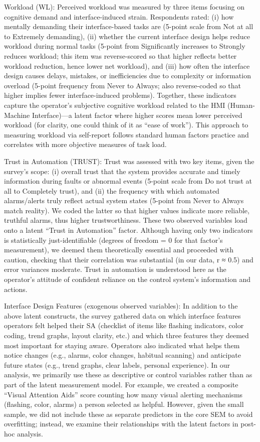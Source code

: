\documentclass[conference]{IEEEtran}
\begin{document}
Workload (WL): Perceived workload was measured by three items focusing on cognitive demand and interface-induced strain. Respondents rated: (i) how mentally demanding their interface-based tasks are (5-point scale from Not at all to Extremely demanding), (ii) whether the current interface design helps reduce workload during normal tasks (5-point from Significantly increases to Strongly reduces workload; this item was reverse-scored so that higher reflects better workload reduction, hence lower net workload), and (iii) how often the interface design causes delays, mistakes, or inefficiencies due to complexity or information overload (5-point frequency from Never to Always; also reverse-coded so that higher implies fewer interface-induced problems). Together, these indicators capture the operator’s subjective cognitive workload related to the HMI (Human-Machine Interface)—a latent factor where higher scores mean lower perceived workload (for clarity, one could think of it as “ease of work”). This approach to measuring workload via self-report follows standard human factors practice and correlates with more objective measures of task load.

Trust in Automation (TRUST): Trust was assessed with two key items, given the survey’s scope: (i) overall trust that the system provides accurate and timely information during faults or abnormal events (5-point scale from Do not trust at all to Completely trust), and (ii) the frequency with which automated alarms/alerts truly reflect actual system states (5-point from Never to Always match reality). We coded the latter so that higher values indicate more reliable, truthful alarms, thus higher trustworthiness. These two observed variables load onto a latent “Trust in Automation” factor. Although having only two indicators is statistically just-identifiable (degrees of freedom = 0 for that factor’s measurement), we deemed them theoretically essential and proceeded with caution, checking that their correlation was substantial (in our data, r ≈ 0.5) and error variances moderate. Trust in automation is understood here as the operator’s attitude of confident reliance on the control system’s information and actions.

Interface Design Features (exogenous observed variables): In addition to the above latent constructs, the survey gathered data on which interface features operators felt helped their SA (checklist of items like flashing indicators, color coding, trend graphs, layout clarity, etc.) and which three features they deemed most important for staying aware. Operators also indicated what helps them notice changes (e.g., alarms, color changes, habitual scanning) and anticipate future states (e.g., trend graphs, clear labels, personal experience). In our analysis, we primarily use these as descriptive or control variables rather than as part of the latent measurement model. For example, we created a composite “Visual Attention Aids” score counting how many visual alerting mechanisms (flashing, color, alarms) a person selected as helpful. However, given the small sample, we did not include these as separate predictors in the core SEM to avoid overfitting; instead, we examine their relationships with the latent factors in post-hoc analysis.
\end{document}
